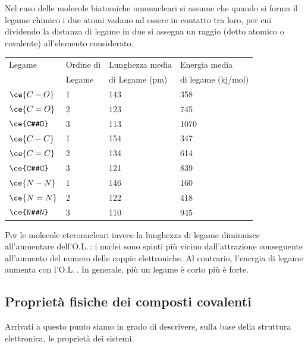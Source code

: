 Nel caso delle molecole biatomiche omonucleari si assume che quando si forma il legame chimico i due atomi vadano ad essere in contatto tra loro, per cui dividendo la distanza di legame in due si assegna un raggio (detto atomico o covalente) all'elemento considerato.

\begin{center}
    \begin{tabular}{m{2.7cm}m{2.3cm}m{3cm}m{2.7cm}}
        Legame & \hspace{-0.6cm}Ordine di & \hspace{-1cm}Lunghezza media & \hspace{-0.6cm}Energia media\\
        & \vspace{-0.3cm}\hspace{-0.5cm}Legame & \hspace{-0.9cm}di Legame (pm) & \hspace{-1cm}di legame (kj/mol)\\[0.2ex] 
        \hline
        $\ce{C-O}$ & 1 & 143 & 358\\
        $\ce{C=O}$ & 2 & 123 & 745\\
        $\ce{C#O}$ & 3 & 113 & \hspace{-0.1cm}1070\\
        $\ce{C-C}$ & 1 & 154 & 347\\
        $\ce{C=C}$ & 2 & 134 & 614\\
        $\ce{C#C}$ & 3 & 121 & 839\\
        $\ce{N-N}$ & 1 & 146 & 160\\
        $\ce{N=N}$ & 2 & 122 & 418\\
        $\ce{N#N}$ & 3 & 110 & 945
    \end{tabular}
\end{center}

Per le molecole eteronucleari invece la lunghezza di legame diminuisce all'aumentare dell'O.L.\,: i nuclei sono spinti più vicino dall'attrazione conseguente all'aumento del numero delle coppie elettroniche. Al contrario, l'energia di legame aumenta con l'O.L.\,. In generale, più un legame è corto più è forte.

\subsection{Proprietà fisiche dei composti covalenti}
Arrivati a questo punto siamo in grado di descrivere, sulla base della struttura elettronica, le proprietà dei sistemi.

